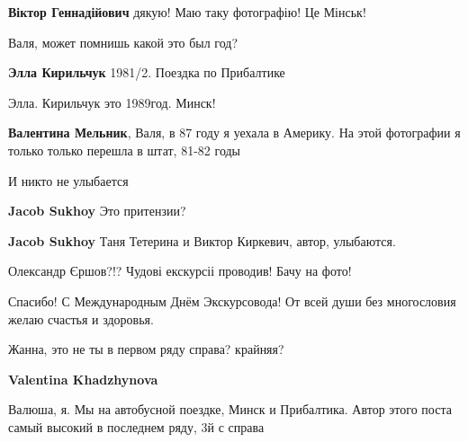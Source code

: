  
 
 
 
 

\textbf{Віктор Геннадійович} дякую! Маю таку фотографію! Це Мінськ!

Валя, может помнишь какой это был год?

\textbf{Элла Кирильчук} 1981/2. Поездка по Прибалтике

Элла. Кирильчук это
1989год. Минск!

\textbf{Валентина Мельник}, Валя, в 87 году я уехала в Америку. На этой фотографии я только только перешла в штат, 81-82 годы

И никто не улыбается

\textbf{Jacob Sukhoy} Это притензии?

\textbf{Jacob Sukhoy} Таня Тетерина и Виктор Киркевич, автор, улыбаются.

Олександр Єршов?!? Чудові екскурсіі проводив! Бачу на фото!

Спасибо! С Международным Днём Экскурсовода! От всей души без многословия желаю счастья и здоровья.

Жанна, это не ты в первом ряду справа? крайняя?

\textbf{Valentina Khadzhynova} 

Валюша, я. Мы на автобусной поездке, Минск и Прибалтика. Автор этого поста
самый высокий в последнем ряду, 3й с справа
